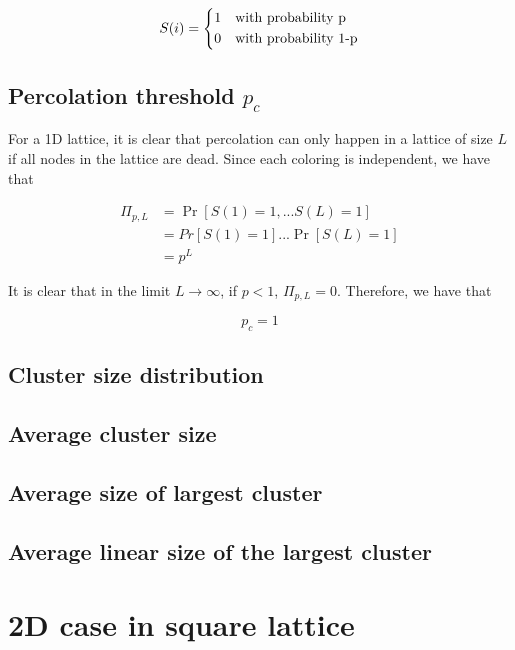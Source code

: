 $$
	S(i) =
    \begin{dcases}
        1 & \text{with probability p} \\
        0 & \text{with probability 1-p} \\
    \end{dcases}
$$

\subsection{Percolation threshold $p_c$}

For a 1D lattice, it is clear that percolation can only happen in a lattice of size $L$ if all nodes in the lattice are dead. Since each coloring is independent, we have that

\begin{equation}
	\begin{split}
		\Pi_{p,L} & = \Pr[S(1) = 1, ... S(L) = 1] \\
				  &	=  Pr[S(1) = 1]...\Pr[S(L) = 1] \\
				  & =  p^L
	\end{split}
\end{equation}

It is clear that in the limit $L \rightarrow \infty $, if $p < 1$, $\Pi_{p,L} = 0$.
Therefore, we have that

$$
p_c = 1
$$

\subsection{Cluster size distribution}

\subsection{Average cluster size}

\subsection{Average size of largest cluster}

\subsection{Average linear size of the largest cluster}



\section{2D case in square lattice}\label{sec:2dsquare}


